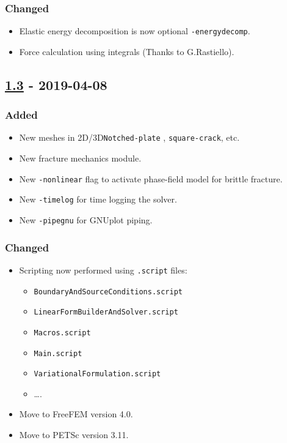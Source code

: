 \subsubsection{Changed}

\begin{itemize}
\tightlist
\item
  Elastic energy decomposition is now optional
  \lstinline!-energydecomp!.
\item
  Force calculation using integrals (Thanks to G.Rastiello).
\end{itemize}

\subsection{\texorpdfstring{\href{https://gitlab.com/PsdSolver/psd_sources/-/tree/v1.3}{1.3}
- 2019-04-08}{1.3 - 2019-04-08}}

\subsubsection{Added}

\begin{itemize}
\tightlist
\item
  New meshes in 2D/3D\lstinline!Notched-plate! ,
  \lstinline!square-crack!, etc.
\item
  New fracture mechanics module.
\item
  New \lstinline!-nonlinear! flag to activate phase-field model for
  brittle fracture.
\item
  New \lstinline!-timelog! for time logging the solver.
\item
  New \lstinline!-pipegnu! for GNUplot piping.
\end{itemize}

\subsubsection{Changed}

\begin{itemize}
\tightlist
\item
  Scripting now performed using \lstinline!.script! files:

  \begin{itemize}
  \tightlist
  \item
    \lstinline!BoundaryAndSourceConditions.script!
  \item
    \lstinline!LinearFormBuilderAndSolver.script!
  \item
    \lstinline!Macros.script!
  \item
    \lstinline!Main.script!
  \item
    \lstinline!VariationalFormulation.script!
  \item
    \ldots{}.
  \end{itemize}
\item
  Move to FreeFEM version 4.0.
\item
  Move to PETSc version 3.11.
\end{itemize}

